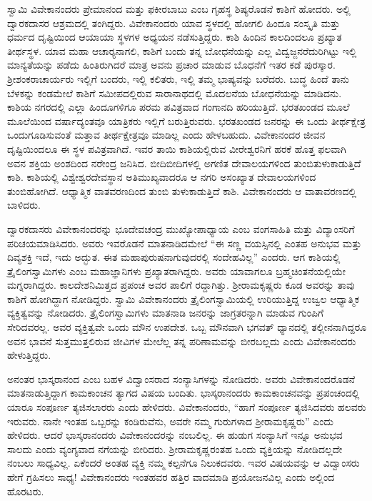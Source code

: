  ಸ್ವಾಮಿ ವಿವೇಕಾನಂದರು ಪ್ರೇಮಾನಂದ ಮತ್ತು ಫಕೀರಬಾಬು ಎಂಬ ಗೃಹಸ್ಥ ಶಿಷ್ಯರೊಡನೆ ಕಾಶಿಗೆ ಹೋದರು. ಅಲ್ಲಿ ದ್ವಾರಕದಾಸರ ಆಶ್ರಮದಲ್ಲಿ ತಂಗಿದ್ದರು. ವಿವೇಕಾನಂದರು ಯಾವ ಸ್ಥಳದಲ್ಲಿ ಹೋಗಲಿ ಹಿಂದೂ ಸಂಸ್ಕೃತಿ ಮತ್ತು ಧರ್ಮದ ದೃಷ್ಟಿಯಿಂದ ಆಯಾಯಾ ಸ್ಥಳಗಳ ಅಧ್ಯಯನ ನಡೆಸುತ್ತಿದ್ದರು. ಕಾಶಿ ಹಿಂದಿನ ಕಾಲದಿಂದಲೂ ಪ್ರಖ್ಯಾತ ತೀರ್ಥಸ್ಥಳ. ಯಾವ ಮಹಾ ಆಚಾರ‍್ಯನಾಗಲಿ, ಕಾಶಿಗೆ ಬಂದು ತನ್ನ ಬೋಧನೆಯನ್ನು ಎಲ್ಲ ವಿದ್ವಜ್ಜನರೆದುರಿಗಿಟ್ಟು ಇಲ್ಲಿ ಮಾನ್ಯತೆಯನ್ನು ಪಡೆದು ಹಿಂತಿರುಗಿದರೆ ಮಾತ್ರ ಅವನು ಪ್ರಚಾರ ಮಾಡುವ ಬೊಧನೆಗೆ ಇತರ ಕಡೆ ಪುರಸ್ಕಾರ. ಶ‍್ರೀಶಂಕರಾಚಾರ್ಯರು ಇಲ್ಲಿಗೆ ಬಂದರು, ಇಲ್ಲಿ ಕಲಿತರು, ಇಲ್ಲಿ ತಮ್ಮ ಭಾಷ್ಯವನ್ನು ಬರೆದರು. ಬುದ್ಧ ಹಿಂದೆ ತಾನು ಬೆಳಕನ್ನು ಕಂಡಮೇಲೆ ಕಾಶಿಗೆ ಸಮೀಪದಲ್ಲಿರುವ ಸಾರಾನಾಥದಲ್ಲಿ ಮೊದಲನೆಯ ಬೋಧನೆಯನ್ನು ಮಾಡಿದನು. ಕಾಶಿಯ ನಗರದಲ್ಲಿ ಎಲ್ಲಾ ಹಿಂದೂಗಳಿಗೂ ಪರಮ ಪವಿತ್ರವಾದ ಗಂಗಾನದಿ ಹರಿಯುತ್ತಿದೆ. ಭರತಖಂಡದ ಮೂಲೆ ಮೂಲೆಯಿಂದ ವರ್ಷಾದ್ಯಂತವೂ ಯಾತ್ರಿಕರು ಇಲ್ಲಿಗೆ ಬರುತ್ತಿರುವರು. ಭರತಖಂಡದ ಜನರನ್ನು ಈ ಒಂದು ತೀರ್ಥಕ್ಷೇತ್ರ ಒಂದುಗೂಡಿಸುವಂತೆ ಮತ್ತಾವ ತೀರ್ಥಕ್ಷೇತ್ರವೂ ಮಾಡಿಲ್ಲ ಎಂದು ಹೇಳಬಹುದು. ವಿವೇಕಾನಂದರ ಜೀವನ ದೃಷ್ಟಿಯಿಂದಲೂ ಈ ಸ್ಥಳ ಪವಿತ್ರವಾಗಿದೆ. ಇವರ ತಾಯಿ ಕಾಶಿಯಲ್ಲಿರುವ ವೀರೇಶ್ವರನಿಗೆ ಹರಕೆ ಹೊತ್ತ ಫಲವಾಗಿ ಅವನ ಶಕ್ತಿಯ ಅಂಶದಿಂದ ನರೇಂದ್ರ ಜನಿಸಿದ. ಬೀದಿಬೀದಿಗಳಲ್ಲಿ ಅಗಣಿತ ದೇವಾಲಯಗಳಿಂದ ತುಂಬಿತುಳುಕಾಡುತ್ತಿದೆ ಕಾಶಿ. ಕಾಶಿಯಲ್ಲಿ ವಿಶ್ವೇಶ್ವರದೇವಸ್ಥಾನ ಅತಿಮುಖ್ಯವಾದರೂ ಆ ನಗರಿ ಅಸಂಖ್ಯಾತ ದೇವಾಲಯಗಳಿಂದ ತುಂಬಿಹೋಗಿದೆ. ಆಧ್ಯಾತ್ಮಿಕ ವಾತವರಣದಿಂದ ತುಂಬಿ ತುಳುಕಾಡುತ್ತಿದೆ ಕಾಶಿ. ವಿವೇಕಾನಂದರು ಆ ವಾತಾವರಣದಲ್ಲಿ ಬಾಳಿದರು. 

 ದ್ವಾರಕದಾಸರು ವಿವೇಕಾನಂದರನ್ನು ಭೂದೇವಚಂದ್ರ ಮುಖ್ಯೋಪಾಧ್ಯಾಯ ಎಂಬ ವಂಗಸಾಹಿತಿ ಮತ್ತು ವಿದ್ಯಾಂಸರಿಗೆ ಪರಿಚಯಮಾಡಿಸಿದರು. ಅವರು ಇವರೊಡನೆ ಮಾತನಾಡಿದಮೇಲೆ “ಈ ಸಣ್ಣ ವಯಸ್ಸಿನಲ್ಲಿ ಎಂತಹ ಅನುಭವ ಮತ್ತು ದಿವ್ಯಶಕ್ತಿ ಇದೆ, ಇದು ಅದ್ಭುತ. ಈತ ಮಹಾಪುರುಷನಾಗುವುದರಲ್ಲಿ ಸಂದೇಹವಿಲ್ಲ” ಎಂದರು. ಆಗ ಕಾಶಿಯಲ್ಲಿ ತ್ರೈಲಿಂಗಸ್ವಾಮಿಗಳು ಎಂಬ ಮಹಾಜ್ಞಾನಿಗಳು ಪ್ರಖ್ಯಾತರಾಗಿದ್ದರು. ಅವರು ಯಾವಾಗಲೂ ಬ್ರಹ್ಮಚಿಂತನೆಯಲ್ಲಿಯೇ ಮಗ್ನರಾಗಿದ್ದರು. ಕಾಲದೇಶನಿಮಿತ್ತದ ಪ್ರಪಂಚ ಅವರ ಪಾಲಿಗೆ ರದ್ದಾಗಿತ್ತು. ಶ‍್ರೀರಾಮಕೃಷ್ಣರು ಕೂಡ ಅವರನ್ನು ತಾವು ಕಾಶಿಗೆ ಹೋಗಿದ್ದಾಗ ನೋಡಿದ್ದರು. ಸ್ವಾಮಿ ವಿವೇಕಾನಂದರು ತ್ರೈಲಿಂಗಸ್ವಾಮಿಯಲ್ಲಿ ಉರಿಯುತ್ತಿದ್ದ ಉಜ್ವಲ ಆಧ್ಯಾತ್ಮಿಕ ವ್ಯಕ್ತಿತ್ವವನ್ನು ನೋಡಿದರು. ತ್ರೈಲಿಂಗಸ್ವಾಮಿಗಳು ಮಾತನಾಡಿ ಜನರನ್ನು ಜಾಗ್ರತರನ್ನಾಗಿ ಮಾಡುವ ಗುಂಪಿಗೆ ಸೇರಿದವರಲ್ಲ. ಅವರ ವ್ಯಕ್ತಿತ್ವವೇ ಒಂದು ಮೌನ ಉಪದೇಶ. ಒಬ್ಬ ಮೌನವಾಗಿ ಭಗವತ್ ಧ್ಯಾನದಲ್ಲಿ ತಲ್ಲೀನನಾಗಿದ್ದರೂ ಅವನ ಭಾವನೆ ಸುತ್ತಮುತ್ತಲಿರುವ ಜೀವಿಗಳ ಮೇಲೆಲ್ಲ ತನ್ನ ಪರಿಣಾಮವನ್ನು ಬೀರಬಲ್ಲದು ಎಂದು ವಿವೇಕಾನಂದರು ಹೇಳುತ್ತಿದ್ದರು.

 ಅನಂತರ ಭಾಸ್ಕರಾನಂದ ಎಂಬ ಬಹಳ ವಿದ್ವಾಂಸರಾದ ಸಂನ್ಯಾಸಿಗಳನ್ನು ನೋಡಿದರು. ಅವರು ವಿವೇಕಾನಂದರೊಡನೆ ಮಾತನಾಡುತ್ತಿದ್ದಾಗ ಕಾಮಕಾಂಚನ ತ್ಯಾಗದ ವಿಷಯ ಬಂದಿತು. ಭಾಸ್ಕರಾನಂದರು ಕಾಮಕಾಂಚನವನ್ನು ಪ್ರಪಂಚಂದಲ್ಲಿ ಯಾರೂ ಸಂಪೂರ್ಣ ತ್ಯಜಿಸಲಾರರು ಎಂದು ಹೇಳಿದರು. ವಿವೇಕಾನಂದರು, “ಹಾಗೆ ಸಂಪೂರ್ಣ ತ್ಯಜಿಸಿದವರು ಹಲವರು ಇರುವರು. ನಾನೇ ಇಂತಹ ಒಬ್ಬರನ್ನು ಕಂಡಿರುವೆನು, ಅವರೇ ನಮ್ಮ ಗುರುಗಳಾದ ಶ‍್ರೀರಾಮಕೃಷ್ಣರು” ಎಂದು ಹೇಳಿದರು. ಆದರೆ ಭಾಸ್ಕರಾನಂದರು ವಿವೇಕಾನಂದರನ್ನು ನಂಬಲಿಲ್ಲ. ಈ ಹುಡುಗ ಸಂನ್ಯಾಸಿಗೆ ಇನ್ನೂ ಅನುಭವ ಸಾಲದು ಎಂದು ವ್ಯಂಗ್ಯವಾದ ನಗೆಯನ್ನು ಬೀರಿದರು. ಶ‍್ರೀರಾಮಕೃಷ್ಣರಂತಹ ಒಂದು ವ್ಯಕ್ತಿಯನ್ನು ನೋಡಿದಲ್ಲದೇ ನಂಬಲು ಸಾಧ್ಯವಿಲ್ಲ. ಏಕೆಂದರೆ ಅಂತಹ ವ್ಯಕ್ತಿ ನಮ್ಮ ಕಲ್ಪನೆಗೂ ನಿಲುಕದವರು. ಇವರ ವಿಷಯವನ್ನು ಆ ವಿದ್ವಾಂಸರು ಹೇಗೆ ಗ್ರಹಿಸಲು ಸಾಧ್ಯ! ವಿವೇಕಾನಂದರು ಇಂತಹವರ ಹತ್ತಿರ ವಾದಮಾಡಿ ಪ್ರಯೋಜನವಿಲ್ಲ ಎಂದು ಅಲ್ಲಿಂದ ಹೊರಟರು. 

